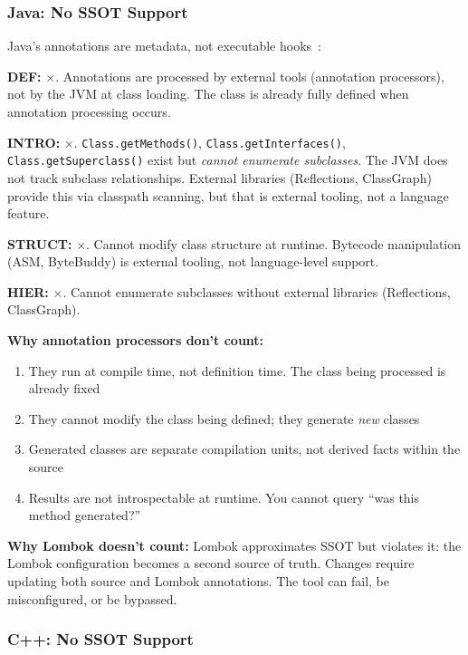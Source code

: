 \subsubsection{Java: No SSOT Support}

Java's annotations are metadata, not executable hooks~\cite{gosling2021java}:

\textbf{DEF:} $\times$. Annotations are processed by external tools (annotation processors), not by the JVM at class loading. The class is already fully defined when annotation processing occurs.

\textbf{INTRO:} $\times$. \texttt{Class.getMethods()}, \texttt{Class.getInterfaces()}, \texttt{Class.getSuperclass()} exist but \emph{cannot enumerate subclasses}. The JVM does not track subclass relationships. External libraries (Reflections, ClassGraph) provide this via classpath scanning, but that is external tooling, not a language feature.

\textbf{STRUCT:} $\times$. Cannot modify class structure at runtime. Bytecode manipulation (ASM, ByteBuddy) is external tooling, not language-level support.

\textbf{HIER:} $\times$. Cannot enumerate subclasses without external libraries (Reflections, ClassGraph).

\textbf{Why annotation processors don't count:}
\begin{enumerate}
\tightlist
\item They run at compile time, not definition time. The class being processed is already fixed
\item They cannot modify the class being defined; they generate \emph{new} classes
\item Generated classes are separate compilation units, not derived facts within the source
\item Results are not introspectable at runtime. You cannot query ``was this method generated?''
\end{enumerate}

\textbf{Why Lombok doesn't count:} Lombok approximates SSOT but violates it: the Lombok configuration becomes a second source of truth. Changes require updating both source and Lombok annotations. The tool can fail, be misconfigured, or be bypassed.

\subsubsection{C++: No SSOT Support}

